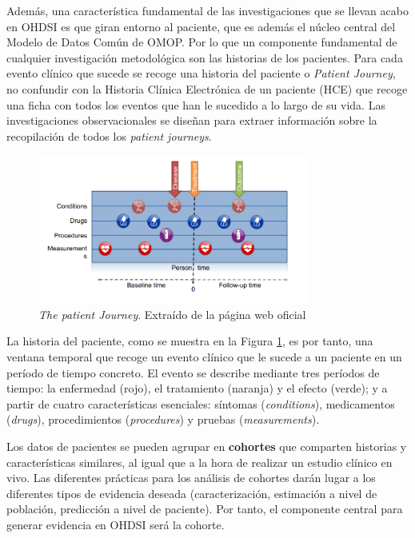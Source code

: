 
Además, una característica fundamental de las investigaciones que se llevan acabo en OHDSI es que giran entorno al paciente, que es además el núcleo central del Modelo de Datos Común de OMOP. Por lo que un componente fundamental de cualquier investigación metodológica son las historias de los pacientes. Para cada evento clínico que sucede se recoge una historia del paciente o \textit{Patient Journey}, no confundir con la Historia Clínica Electrónica de un paciente (HCE) que recoge una ficha con todos los eventos que han le sucedido a lo largo de su vida. Las investigaciones observacionales se diseñan para extraer información sobre la recopilación de todos los \textit{patient journeys}.

\begin{figure}[H]
    \centering
    \includegraphics[width=0.80\textwidth]{figures/patientJourney.png}
     \caption{\textit{The patient Journey}. Extraído de la página web oficial \cite{OHDSIbook}}
    \label{fig:patientJourney}
\end{figure}

La historia del paciente,  como se muestra en la Figura \ref{fig:patientJourney}, es por tanto, una ventana temporal que recoge un evento clínico que le sucede a un paciente en un período de tiempo concreto. El evento se describe mediante tres períodos de tiempo: la enfermedad (rojo), el tratamiento (naranja) y el efecto (verde); y a partir de cuatro características esenciales: síntomas (\textit{conditions}), medicamentos (\textit{drugs}), procedimientos (\textit{procedures}) y pruebas (\textit{measurements}).

Los datos de pacientes se pueden agrupar en \textbf{cohortes} que comparten historias y características similares, al igual que a la hora de realizar un estudio clínico en vivo. Las diferentes  prácticas para los análisis de cohortes darán lugar a los diferentes tipos de evidencia deseada (caracterización, estimación a nivel de población, predicción a nivel de paciente). Por tanto, el componente central para generar evidencia en OHDSI será la cohorte.

